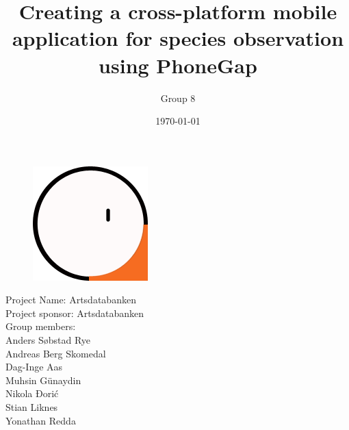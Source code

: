 \documentclass[a4paper]{article}
\begin{document}
  \title{Creating a cross-platform mobile application for species observation using PhoneGap}
  
  \begin{figure}
    \centering
        \includegraphics[scale=1.0]{Logo_.png}
  \end{figure}
    
	\author{Group 8}
	\date{\today}
	\maketitle
	\thispagestyle{empty}
	\pagebreak

	\pagestyle{empty}
	\begin{center}
		Project Name: Artsdatabanken \\
		Project sponsor: Artsdatabanken \\
    Group members: \\
    Anders Søbstad Rye\\
    Andreas Berg Skomedal\\
    Dag-Inge Aas\\
    Muhsin Günaydin\\
    Nikola Đorić\\
    Stian Liknes\\
    Yonathan Redda
	\end{center}
	\newpage

	\tableofcontents
	\listoffigures
	\listoftables

	\newpage
	\pagestyle{plain}
	\setcounter{page}{1}
  

  \newpage
	

  \newpage
  

	\newpage
	

	\newpage
	

	\newpage

	

	\newpage
	

	\newpage
	

	\newpage
	

	\newpage
	
	
	\newpage
	

	\newpage	
	
	\newpage
	
	
	
	\newpage
	\clearpage
		\nocite{*}
		
		
\end{document}
